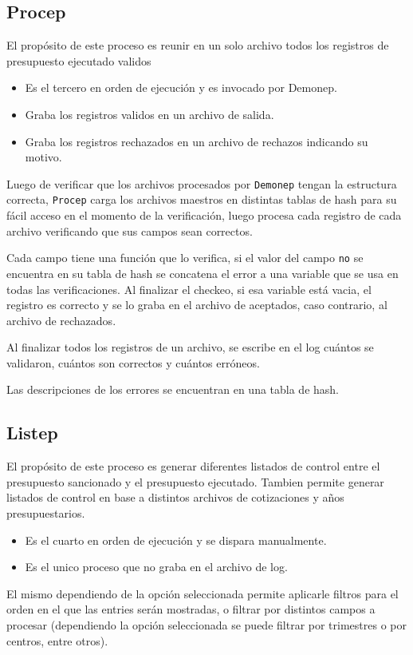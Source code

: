 \documentclass[10pt,a4paper]{article}
\begin{document}
\subsection{Procep}
El propósito de este proceso es reunir en un solo archivo todos los registros de presupuesto ejecutado validos 
\begin{itemize}
    \item Es el tercero en orden de ejecución y es invocado por Demonep.
    \item Graba los registros validos en un archivo de salida.
    \item Graba los registros rechazados en un archivo de rechazos indicando su motivo.
\end{itemize}
Luego de verificar que los archivos procesados por \texttt{Demonep} tengan la estructura correcta, \texttt{Procep} carga los archivos maestros en distintas tablas de hash para su fácil acceso en el momento de la verificación, luego procesa cada registro de cada archivo verificando que sus campos sean correctos.

Cada campo tiene una función que lo verifica, si el valor del campo \texttt{no} se encuentra en su tabla de hash se concatena el error a una variable que se usa en todas las verificaciones. Al finalizar el checkeo, si esa variable está vacia, el registro es correcto y se lo graba en el archivo de aceptados, caso contrario, al archivo de rechazados.

Al finalizar todos los registros de un archivo, se escribe en el log cuántos se validaron, cuántos son correctos y cuántos erróneos.

Las descripciones de los errores se encuentran en una tabla de hash.

\subsection{Listep}
El propósito de este proceso es generar diferentes listados de control entre el presupuesto 
sancionado y el presupuesto ejecutado. Tambien permite generar listados de control en base a distintos archivos de cotizaciones y años presupuestarios.
\begin{itemize}
    \item Es el cuarto en orden de ejecución y se dispara manualmente.
    \item Es el unico proceso que no graba en el archivo de log.   
\end{itemize} 

El mismo dependiendo de la opción seleccionada permite aplicarle filtros para el orden en el que las entries serán mostradas, o filtrar por distintos campos a procesar (dependiendo la opción seleccionada se puede filtrar por trimestres o por centros, entre otros).
\end{document}
